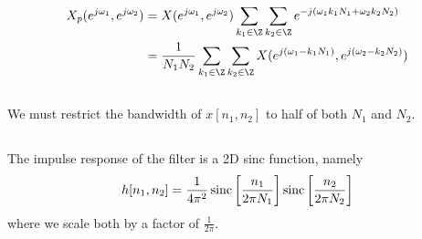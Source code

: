 \documentclass{article}
\begin{document}
\subsection{}

\begin{align}
    X_p(e^{j \omega_1}, e^{j \omega_2}) &= X(e^{j \omega_1}, e^{j \omega_2}) \sum_{k_1 \in \Z} \sum_{k_2 \in \Z} e^{-j (\omega_1 k_1 N_1 + \omega_2 k_2 N_2)} \\
    &= \frac{1}{N_1 N_2} \sum_{k_1 \in \Z} \sum_{k_2 \in \Z} X(e^{j (\omega_1 - k_1 N_1)}, e^{j (\omega_2 - k_2 N_2)})
\end{align}

\subsection{}

We must restrict the bandwidth of \(x[n_1, n_2]\) to half of both \(N_1\) and \(N_2\).

\subsection{}

The impulse response of the filter is a 2D sinc function, namely
\begin{equation}
    h[n_1, n_2] = \frac{1}{4\pi^2} \operatorname{sinc}\qty[\frac{n_1}{2\pi N_1}] \operatorname{sinc}\qty[\frac{n_2}{2\pi N_2}]
\end{equation}
where we scale both by a factor of \(\frac{1}{2\pi}\).
\end{document}
